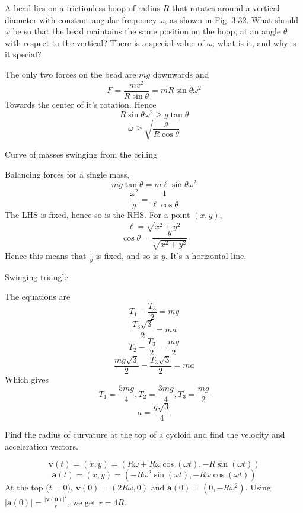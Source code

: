 \documentclass[11pt]{scrartcl}
\begin{document}
\begin{example}
  [3.56]
\end{example}
\begin{soln}
\end{soln}
\begin{example}
  [3.57]
  A bead lies on a frictionless hoop of radius $R$ that rotates around a vertical
  diameter with constant angular frequency $\omega$, as shown in Fig. 3.32. What
  should $\omega$ be so that the bead maintains the same position on the hoop,
  at an angle $\theta$ with respect to the vertical? There is a special value of $\omega$;
  what is it, and why is it special?
\end{example}
\begin{soln}
  The only two forces on the bead are $mg$ downwards and
  $$F=\frac{mv^2}{R\sin\theta}=mR\sin\theta\omega^2$$
  Towards the center of it's rotation. Hence
  $$R\sin\theta\omega^2\ge g\tan\theta$$
  $$\omega \ge \sqrt{\frac{g}{R\cos\theta}}$$
\end{soln}
\begin{example}
  [3.58]
  Curve of masses swinging from the ceiling
\end{example}
\begin{soln}
  Balancing forces for a single mass,
  $$mg\tan\theta=m\ell\sin\theta\omega^2$$
  $$\frac{\omega^2}{g}=\frac{1}{\ell \cos\theta}$$
  The LHS is fixed, hence so is the RHS. For a point $(x,y)$,
  $$\ell=\sqrt{x^2+y^2}$$
  $$\cos\theta=\frac{y}{\sqrt{x^2+y^2}}$$
  Hence this means that $\frac{1}{y}$ is fixed, and so is $y$. It's a horizontal line.

\end{soln}
\begin{example}
  [3.59]
  Swinging triangle
\end{example}
\begin{soln}
  The equations are
  $$T_1-\frac{T_3}{2}=mg$$
  $$\frac{T_3\sqrt{3}}{2}=ma$$
  $$T_2-\frac{T_3}{2}=\frac{mg}{2}$$
  $$\frac{mg\sqrt{3}}{2}-\frac{T_3\sqrt{3}}{2}=ma$$
  Which gives
  $$T_1=\frac{5mg}{4}, T_2=\frac{3mg}{4}, T_3=\frac{mg}{2}$$
  $$a=\frac{g\sqrt{3}}{4}$$
\end{soln}
\begin{example}
  [3.61]
  Find the radius of curvature at the top of a cycloid and find the velocity and acceleration vectors.
\end{example}
\begin{soln}
  $$\mathbf{v}(t)=(\dot{x}, \dot{y})=(R\omega+R\omega\cos(\omega t), -R\sin(\omega t))$$
  $$\mathbf{a}(t)=(\ddot{x}, \ddot{y})=(-R\omega^2\sin(\omega t), -R\omega \cos(\omega t))$$
  At the top ($t=0$), $\mathbf{v}(0)=(2R\omega, 0)$ and $\mathbf{a}(0)=(0,-R\omega^2)$.
  Using $|\mathbf{a}(0)|=\frac{|\mathbf{v(0)}|^2}{r}$, we get $r=4R$.
\end{soln}
\end{document}
